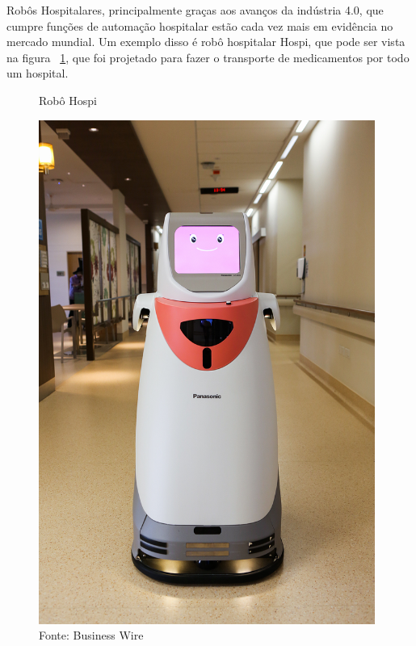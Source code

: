 \documentclass[../delivery_hospital_report.tex]{subfiles}
\begin{document}
Robôs Hospitalares, principalmente graças aos avanços da indústria 4.0, que cumpre funções de automação hospitalar estão cada vez mais em evidência no mercado mundial. Um exemplo disso é robô hospitalar Hospi, que pode ser vista na figura ~\ref{fig: Robô Hospi}, que foi projetado para fazer o transporte de medicamentos por todo um hospital. 


\begin{figure}[h]
\centering
    \caption{Robô Hospi}
    \centering %
    \includegraphics[width=11cm]{hospi.jpg}
    \caption*{Fonte: Business Wire}
    \label{fig: Robô Hospi}
\end{figure}
\end{document}
